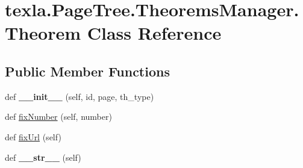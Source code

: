 \hypertarget{classtexla_1_1PageTree_1_1TheoremsManager_1_1Theorem}{}\section{texla.\+Page\+Tree.\+Theorems\+Manager.\+Theorem Class Reference}
\label{classtexla_1_1PageTree_1_1TheoremsManager_1_1Theorem}
\subsection*{Public Member Functions}
\begin{DoxyCompactItemize}
\item 
\hypertarget{classtexla_1_1PageTree_1_1TheoremsManager_1_1Theorem_abf229dbbda7151f0975d4e4ffb46e779}{}\label{classtexla_1_1PageTree_1_1TheoremsManager_1_1Theorem_abf229dbbda7151f0975d4e4ffb46e779} 
def {\bfseries \+\_\+\+\_\+init\+\_\+\+\_\+} (self, id, page, th\+\_\+type)
\item 
def \hyperlink{classtexla_1_1PageTree_1_1TheoremsManager_1_1Theorem_a95c04605568b92d092b5c30b1538e318}{fix\+Number} (self, number)
\item 
def \hyperlink{classtexla_1_1PageTree_1_1TheoremsManager_1_1Theorem_a894e4a4e21490eab706503be1c65c6d9}{fix\+Url} (self)
\item 
\hypertarget{classtexla_1_1PageTree_1_1TheoremsManager_1_1Theorem_aa0ee71e9d0390c7d35c25521d5e95f84}{}\label{classtexla_1_1PageTree_1_1TheoremsManager_1_1Theorem_aa0ee71e9d0390c7d35c25521d5e95f84} 
def {\bfseries \+\_\+\+\_\+str\+\_\+\+\_\+} (self)
\end{DoxyCompactItemize}
